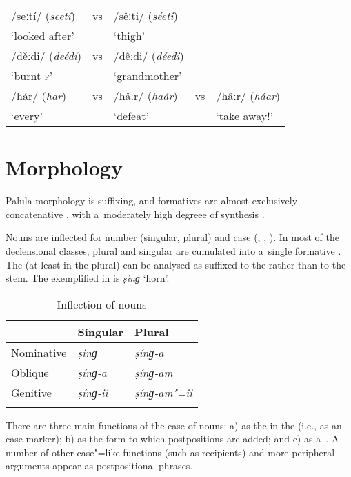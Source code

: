 \begin{exe}
\extab
\label{ex:2-a}
\begin{tabularx}{116mm}{ l l l l l }
/seːtí/ (\textit{seetí})  &
vs &
/sêːti/ (\textit{séeti}) \\
`looked after' &
&
`thigh' \\
/děːdi/ (\textit{deédi})  &
vs &
/dêːdi/ (\textit{déedi})  \\
`burnt \textsc{f}' &
&
`grandmother' \\
/hár/ (\textit{har})  &
vs &
/hǎːr/ (\textit{haár})  &
vs &
/hâːr/ (\textit{háar}) \\
`every' &
&
`defeat' &
&
`take away!'\\
\end{tabularx}
\end{exe}


\section{Morphology}
\label{sec:2-2}

Palula morphology is suffixing, and formatives are almost exclusively concatenative \citep{bickel_fusion_2013}, with a~moderately high degreee of synthesis \citep{bickel_inflectional_2013}. 


Nouns are inflected for number (singular, plural) and case (, , ). In most of the declensional classes,  plural and  singular are cumulated into a~single formative \citep{bickel_exponence_2013}. The  (at least in the plural) can be analysed as suffixed to the  rather than to the  stem. The  exemplified in  is \textit{ṣinɡ} `horn'.

\begin{table}[ht]
\caption{Inflection of nouns}
\begin{tabularx}{.5\textwidth}{ Q Q Q }
\lsptoprule
&
Singular &
Plural
\\\midrule
Nominative &
\textit{ṣinɡ} &
\textit{ṣínɡ-a}\\
Oblique &
\textit{ṣínɡ-a} &
\textit{ṣínɡ-am}\\ 
Genitive &
\textit{ṣínɡ-ii} &
\textit{ṣínɡ-am"=ii}
\\\lspbottomrule
\end{tabularx}
\label{tab:2-nouns}
\end{table}


There are three main functions of the  case of nouns: a) as the   in the  (i.e., as an  case marker); b) as the form to which postpositions are added; and c) as a~. A number of other case"=like functions (such as recipients) and more peripheral arguments appear as postpositional phrases.


